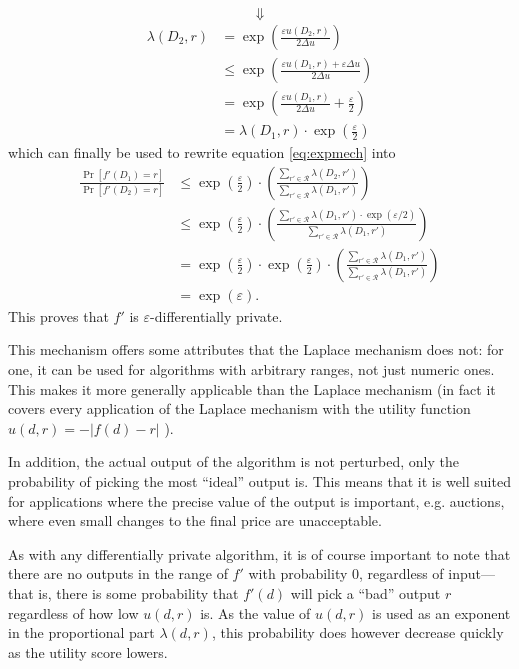 \documentclass[12pt]{article}
\newcommand{\fancy}{\mathcal}
\renewcommand{\epsilon}{\varepsilon}
\begin{document}
$$\Downarrow$$
\begin{align*}
    \lambda(D_2,r) &= \exp\left( \frac{\epsilon u(D_2,r)}{2\Delta u} \right) \\
        &\leq \exp\left( \frac{\epsilon u(D_1,r) + \epsilon\Delta u}{2\Delta u} \right) \\
        &= \exp\left( \frac{\epsilon u(D_1,r)}{2\Delta u} + \frac{\epsilon}{2} \right) \\
        &= \lambda(D_1,r) \cdot \exp \left( \frac{\epsilon}{2} \right)
\end{align*}
which can finally be used to rewrite equation \ref{eq:expmech} into
\begin{align*}
    \frac{\Pr[f'(D_1) = r]}{\Pr[f'(D_2) = r]} &\leq \exp \left( \frac{\epsilon}{2} \right) \cdot \left( \frac{\sum_{r'\in\fancy{R}} \lambda(D_2,r')}{\sum_{r'\in\fancy{R}} \lambda(D_1,r')} \right) \\
        &\leq \exp\left( \frac{\epsilon}{2} \right) \cdot \left( \frac{\sum_{r'\in\fancy{R}} \lambda(D_1,r')\cdot \exp(\epsilon/2)}{\sum_{r'\in\fancy{R}} \lambda(D_1,r')} \right) \\
        &= \exp\left( \frac{\epsilon}{2} \right) \cdot \exp\left( \frac{\epsilon}{2} \right) \cdot \left( \frac{\sum_{r'\in\fancy{R}} \lambda(D_1,r')}{\sum_{r'\in\fancy{R}} \lambda(D_1,r')} \right) \\
        &= \exp(\epsilon).
\end{align*}
This proves that $f'$ is $\epsilon$-differentially private. \bigskip

This mechanism offers some attributes that the Laplace mechanism does not: for one, it can be used for algorithms with arbitrary ranges, not just numeric ones. This makes it more generally applicable than the Laplace mechanism (in fact it covers every application of the Laplace mechanism with the utility function $u(d,r)=-|f(d)-r|$ \cite{sherry_exponentialmech}).

In addition, the actual output of the algorithm is not perturbed, only the probability of picking the most ``ideal'' output is. This means that it is well suited for applications where the precise value of the output is important, e.g. auctions, where even small changes to the final price are unacceptable.

As with any differentially private algorithm, it is of course important to note that there are no outputs in the range of $f'$ with probability 0, regardless of input---that is, there is some probability that $f'(d)$ will pick a ``bad'' output $r$ regardless of how low $u(d, r)$ is. As the value of $u(d,r)$ is used as an exponent in the proportional part $\lambda(d,r)$, this probability does however decrease quickly as the utility score lowers.
\end{document}
